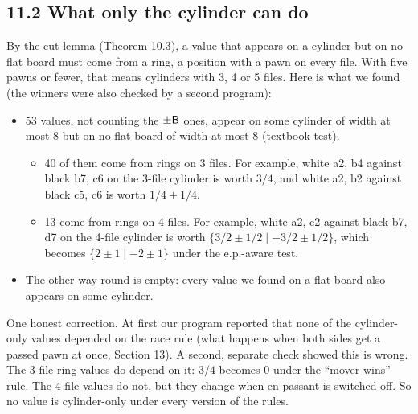 \subsection*{11.2 What only the cylinder can do}

\indent By the cut lemma (Theorem 10.3), a value that appears on a cylinder but on no flat board must come from a
ring, a position with a pawn on every file. With five pawns or fewer, that means cylinders with 3, 4 or 5 files.
Here is what we found \computedone{} (the winners were also checked by a second program):
\begin{itemize}
\item 53 values, not counting the $\pm\mathsf{B}$ ones, appear on some cylinder of width at most 8 but on no flat board
  of width at most 8 (textbook test).
  \begin{itemize}
  \item 40 of them come from rings on 3 files. For example, white a2, b4 against black b7, c6 on the
    3-file cylinder is worth $3/4$, and white a2, b2 against black c5, c6 is worth $1/4 \pm 1/4$.
  \item 13 come from rings on 4 files. For example, white a2, c2 against black b7, d7 on the 4-file cylinder is
    worth $\{3/2 \pm 1/2 \mid -3/2 \pm 1/2\}$, which becomes $\{2 \pm 1 \mid -2 \pm 1\}$ under the e.p.-aware test.
  \end{itemize}
\item The other way round is empty: every value we found on a flat board also appears on some cylinder.
\end{itemize}

\indent One honest correction. At first our program reported that none of the cylinder-only values depended on
the race rule (what happens when both sides get a passed pawn at once, Section 13). A second, separate check showed
this is wrong. The 3-file ring values do depend on it: $3/4$ becomes $0$ under the ``mover wins'' rule. The 4-file
values do not, but they change when en passant is switched off. So no value is cylinder-only under every
version of the rules.
